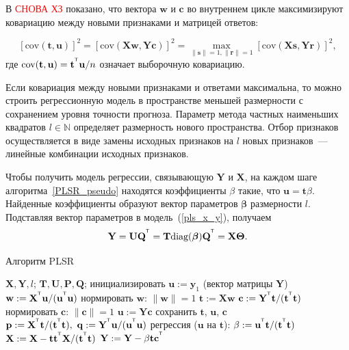 \documentclass[12pt,fleqn,unicode]{article}
\newcommand{\by}{\mathbf{y}}
\newcommand{\bw}{\mathbf{w}}
\newcommand{\bY}{\mathbf{Y}}
\newcommand{\bX}{\mathbf{X}}
\newcommand{\bu}{\mathbf{u}}
\newcommand{\bt}{\mathbf{t}}
\newcommand{\bp}{\mathbf{p}}
\newcommand{\bq}{\mathbf{q}}
\newcommand{\br}{\mathbf{r}}
\newcommand{\bc}{\mathbf{c}}
\newcommand{\bs}{\mathbf{s}}
\newcommand{\bP}{\mathbf{P}}
\newcommand{\bT}{\mathbf{T}}
\newcommand{\bQ}{\mathbf{Q}}
\newcommand{\bU}{\mathbf{U}}
\newcommand{\bTheta}{\boldsymbol{\Theta}}
\newcommand{\T}{^{\text{\tiny\sffamily\upshape\mdseries T}}}
\begin{document}
В \cite{ng2013simple} \textcolor{red}{СНОВА ХЗ} показано, что вектора 
$\bw$ и $\bc$ во внутреннем цикле максимизируют ковариацию между новыми признаками и матрицей ответов:

$$
        [\text{cov} (\bt, \bu)]^2 = [\text{cov} (\bX \bw, \bY \bc)]^2 = \max\limits_{\|\bs\|=1, \|\br\|=1} [\text{cov} (\bX \bs, \bY \br)]^2, 
$$
где $\text{cov} (\bt, \bu) = \bt^{\T} \bu / n$ означает выборочную ковариацию.

Если ковариация между новыми признаками и ответами максимальна, то можно строить регрессионную модель в пространстве меньшей размерности с сохранением уровня точности прогноза. Параметр метода частных наименьших квадратов $l \in \mathbb{N}$ определяет размерность нового пространства. Отбор признаков осуществляется в виде замены исходных признаков на $l$ новых признаков~--- линейные комбинации исходных признаков.


Чтобы получить модель регрессии, связывающую $\bY$ и $\bX$, на каждом шаге алгоритма~\ref{PLSR_pseudo} находятся коэффициенты $\beta$ такие, что $\bu = \bt \beta$. Найденные коэффициенты образуют вектор параметров $\boldsymbol{\beta}$ размерности $l$. 
Подставляя вектор параметров в модель~(\ref{pls_x_y}), получаем
$$
    \bY = \bU\bQ^{\T} = \bT \text{diag}(\boldsymbol{\beta}) \bQ^{\T} = \bX \bTheta.
$$

\begin{center}
\begin{algorithm}[h]
\caption{Алгоритм PLSR}
    \label{PLSR_pseudo}
\begin{algorithmic}[1]
\REQUIRE $\bX, \bY, l$;
\ENSURE $\bT, \bU, \bP, \bQ$;
\STATE инициализировать $\bu := \by_1$ (вектор матрицы $\bY$)
  \REPEAT
    \STATE $\bw := \bX^{\T} \bu / (\bu^{\T} \bu)$
    \STATE нормировать $\bw$: $\| \bw \| = 1$
    \STATE $\mathbf{t} := \bX \bw$
    \STATE $\bc := \bY^{\T} \bt / (\bt^{\T} \bt)$
    \STATE нормировать $\bc$:  $\| \bc \| = 1$
    \STATE $\bu := \bY \bc$
  \UNTIL{$\bt$ не перестанет меняться}
  \STATE сохранить $\bt$, $\bu$, $\bc$
  \STATE $\bp := \bX^{\T}\bt/(\bt^{\T}\bt),\ \bq := \bY^{\T}\bu/(\bu^{\T}\bu)$
  \STATE регрессия ($\bu$ на $\bt$): $\beta := \bu^{\T} \bt / (\bt^{\T} \bt)$ 
  \STATE $\bX := \bX - \bt\bt^{\T}\bX/(\bt^{\T}\bt)$
  \STATE $\bY := \bY - \beta\bt\bc^{\T}$ 
\ENDFOR
\end{algorithmic}
\end{algorithm}
\end{center}
\end{document}
